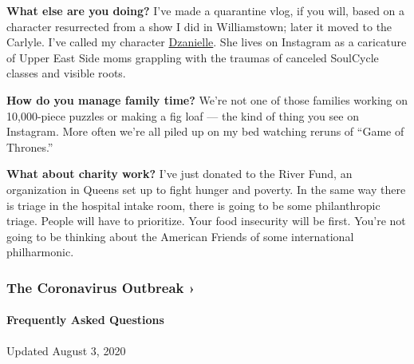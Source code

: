 \textbf{What else are you doing?} I've made a quarantine vlog, if you
will, based on a character resurrected from a show I did in
Williamstown; later it moved to the Carlyle. I've called my character
\href{https://www.instagram.com/stories/highlights/17856598183860833/?hl=en}{Dzanielle}.
She lives on Instagram as a caricature of Upper East Side moms grappling
with the traumas of canceled SoulCycle classes and visible roots.

\textbf{How do you manage family time?} We're not one of those families
working on 10,000-piece puzzles or making a fig loaf --- the kind of
thing you see on Instagram. More often we're all piled up on my bed
watching reruns of ``Game of Thrones.''

\textbf{What about charity work?} I've just donated to the River Fund,
an organization in Queens set up to fight hunger and poverty. In the
same way there is triage in the hospital intake room, there is going to
be some philanthropic triage. People will have to prioritize. Your food
insecurity will be first. You're not going to be thinking about the
American Friends of some international philharmonic.

\href{https://www.nytimes.com/news-event/coronavirus?action=click\&pgtype=Article\&state=default\&region=MAIN_CONTENT_3\&context=storylines_faq}{}

\hypertarget{the-coronavirus-outbreak-}{%
\subsubsection{The Coronavirus Outbreak
›}\label{the-coronavirus-outbreak-}}

\hypertarget{frequently-asked-questions}{%
\paragraph{Frequently Asked
Questions}\label{frequently-asked-questions}}

Updated August 3, 2020

